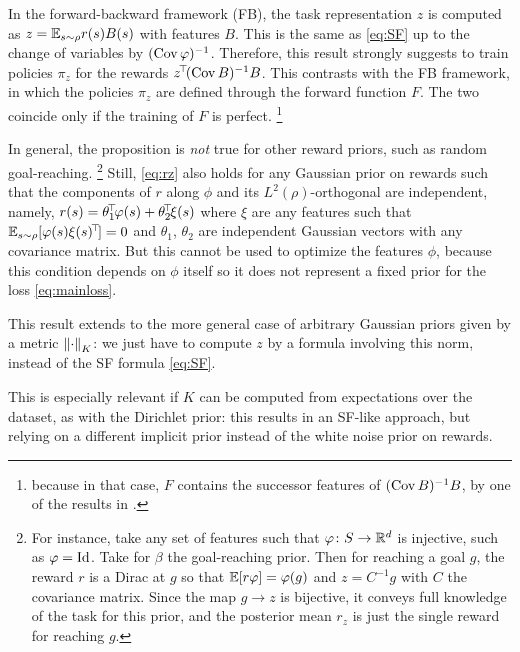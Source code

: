 \documentclass[11pt,a4paper]{article}
\begin{document}
In the forward-backward framework (FB), the task representation $z$ is
computed as $z=\mathbb{E}_{s\sim \rho} r(s)B(s)$ with features $B$. This is the
same as \eqref{eq:SF} up to the change of variables by $(\operatorname{Cov}
\varphi)^{-1}$. Therefore, this result strongly suggests to train policies
$\pi_z$ for the rewards $z^{\!\top}\!(\operatorname{Cov} B)^{-1}B$. This contrasts with
the FB framework, in which the policies $\pi_z$ are defined through the
forward function $F$. The two coincide only if the training of $F$ is
perfect. \footnote{because in that case, $F$ contains the successor
features of $(\operatorname{Cov} B)^{-1}B$, by one of the results in
\cite{allpolicies}.}

In general, the proposition is \emph{not} true for other reward priors, such as
random goal-reaching. \footnote{For instance, take any set of features
such that $\varphi\colon S\to {\mathbb{R}}^d$ is injective, such as $\varphi=\operatorname{Id}$. Take
for $\beta$ the goal-reaching prior. Then for reaching a goal $g$, the
reward $r$ is a Dirac at $g$ so that
$\mathbb{E} [r\varphi]=\varphi(g)$ and
$z=C^{-1}g$ with $C$ the covariance matrix. Since the map $g\to z$ is
bijective, it conveys full knowledge of the task for this prior, and the
posterior mean $r_z$ is just the single reward for reaching $g$.}
Still, \eqref{eq:rz} also
holds for any Gaussian prior on rewards such that the
components of $r$ along $\phi$ and its $L^2(\rho)$-orthogonal are independent, namely,
$r(s)=\theta_1^{\!\top}\!\varphi(s)+\theta_2^{\!\top}\!\xi(s)$ where $\xi$ are
any features such that $\mathbb{E}_{s\sim \rho}[\varphi(s)\xi(s)^{\!\top}\!]=0$ and
$\theta_1$, $\theta_2$ are independent Gaussian vectors with any
covariance matrix. But this cannot be used to optimize the features
$\phi$, because this condition depends on $\phi$ itself so it does not
represent a fixed prior for the loss \eqref{eq:mainloss}.

\bigskip

This result extends to the more general case of arbitrary Gaussian priors
given by a metric $\left\lVert\cdot\right\rVert_K$: we just have to compute $z$ by a formula
involving this norm, instead of the SF formula
\eqref{eq:SF}. 

This is especially relevant if $K$
can be computed from expectations over the dataset, as with the Dirichlet
prior: this results in an SF-like approach, but relying on a different
implicit prior instead of the white noise prior on rewards.
\end{document}
